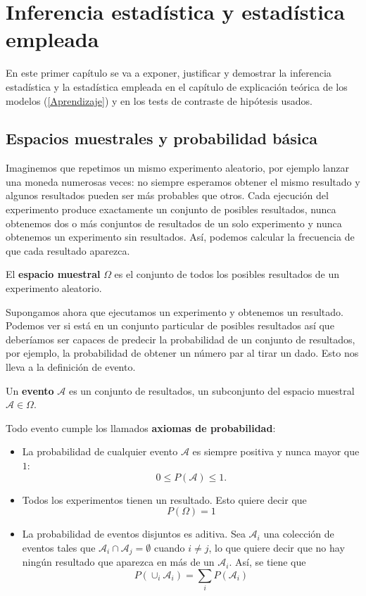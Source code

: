 
\chapter{Inferencia estadística y estadística empleada}\label{Inferencia}
En este primer capítulo se va a exponer, justificar y demostrar la inferencia estadística y la estadística empleada en el capítulo de explicación teórica de los modelos (\autoref{Aprendizaje}) y en los tests de contraste de hipótesis usados.\\
\section{Espacios muestrales y probabilidad básica}
Imaginemos que repetimos un mismo experimento aleatorio, por ejemplo lanzar una moneda numerosas veces: no siempre esperamos obtener el mismo resultado y algunos resultados pueden ser más probables que otros. Cada ejecución del experimento produce exactamente un conjunto de posibles resultados, nunca obtenemos dos o más conjuntos de resultados de un solo experimento y nunca obtenemos un experimento sin resultados. Así, podemos calcular la frecuencia de que cada resultado aparezca.
\begin{definicion}
El \textbf{espacio muestral} $\Omega$ es el conjunto de todos los posibles resultados de un experimento aleatorio.
\end{definicion} 
Supongamos ahora que ejecutamos un experimento y obtenemos un resultado. Podemos ver si está en un conjunto particular de posibles resultados así que deberíamos ser capaces de predecir la probabilidad de un conjunto de resultados, por ejemplo, la probabilidad de obtener un número par al tirar un dado. Esto nos lleva a la definición de evento.
\begin{definicion}
Un \textbf{evento} $\mathcal{A}$ es un conjunto de resultados, un subconjunto del espacio muestral $\mathcal{A} \in \Omega$. 
\end{definicion}
Todo evento cumple los llamados \textbf{axiomas de probabilidad}: \cite{forsyth2018probability}\\
\begin{itemize}
 \item La probabilidad de cualquier evento $\mathcal{A}$ es siempre positiva y nunca mayor que $1$: \[ 0 \leq P(\mathcal{A}) \leq 1. \]
 \item Todos los experimentos tienen un resultado. Esto quiere decir que \[ P(\Omega)=1 \]
 \item La probabilidad de eventos disjuntos es aditiva. Sea $\mathcal{A}_{i}$ una colección de eventos tales que $\mathcal{A}_{i} \cap \mathcal{A}_{j}=\emptyset$ cuando $i \neq j$, lo que quiere decir que no hay ningún resultado que aparezca en más de un $\mathcal{A}_{i}$. Así, se tiene que
\[ P(\cup_{i}\mathcal{A}_{i})= \sum_{i}P(\mathcal{A}_{i}) \]
\end{itemize}
